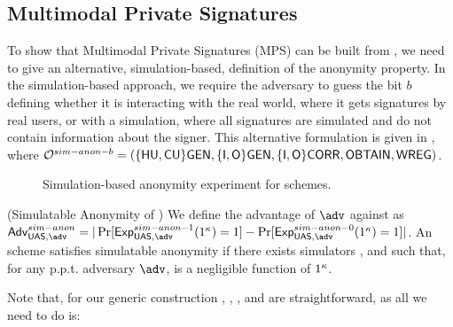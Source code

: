 \subsection{Multimodal Private Signatures}
\label{ssec:uas-mps}

To show that Multimodal Private Signatures (MPS) \needcite can be built from
\UAS, we need to give an alternative, simulation-based, definition of the
anonymity property. In the simulation-based approach, we require the adversary
to guess the bit $b$ defining whether it is interacting with the real world,
where it gets signatures by real users, or with a simulation, where all
signatures are simulated and do not contain information about the signer.
This alternative formulation is given in , where
$\mathcal{O}^{sim-anon-b} = (\lbrace\mathsf{HU},\mathsf{CU}\rbrace\mathsf{GEN},\lbrace\mathsf{I},\mathsf{O}\rbrace\mathsf{GEN},\lbrace\mathsf{I},
\mathsf{O}\rbrace\mathsf{CORR},\mathsf{OBTAIN},\mathsf{WREG})$.

\begin{figure}[htp!]

  \centering
  
  \caption{Simulation-based anonymity experiment for \UAS schemes.}
  \label{fig:exp-uas-simanon}
\end{figure}

\begin{definition}{(Simulatable Anonymity of \UAS)}
  \label{def:sim-anonymity-uas}  
  We define the advantage \AdvSimAnon of $\adv$ against \ExpSimAnonb as
  $\AdvSimAnon=|\Pr\lbrack\ExpSimAnono(1^\secpar)=1\rbrack-
  \Pr\lbrack\ExpSimAnonz(1^\secpar)=1\rbrack|$.
  An \UAS scheme satisfies simulatable anonymity if there exists simulators
  \SIMSETUP, \SIMSIGN and \SIMOPEN such that, for any p.p.t. adversary $\adv$,
  \AdvSimAnon is a negligible function of $1^\kappa$.
\end{definition}

Note that, for our generic construction \CUASGen, \SIMSETUP, \SIMSIGN, and
\SIMOPEN are straightforward, as all we need to do is:

